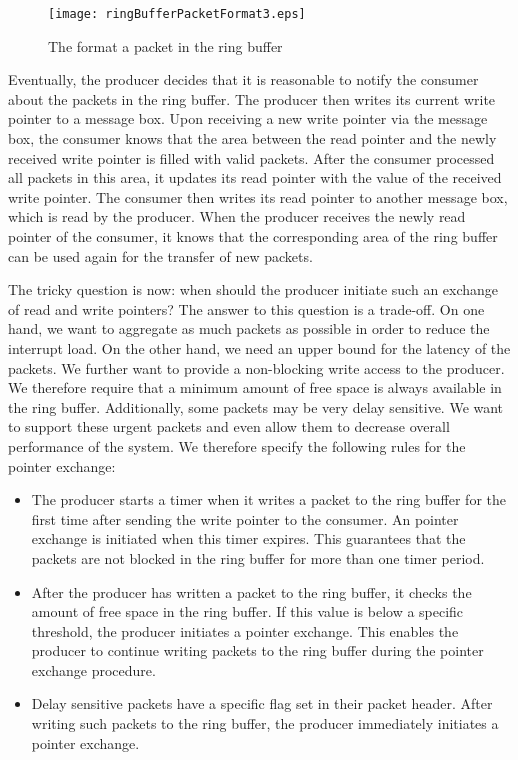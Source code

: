\begin{figure}
  \begin{center}
		 \texttt{[image: ringBufferPacketFormat3.eps]}
  \caption{The format a packet in the ring buffer}
  \label{ringBufferPacketFormat.eps}
  \end{center}
\end{figure}
Eventually, the producer decides that it is reasonable to notify the consumer about the packets in the ring buffer. The producer then writes its current write pointer to a message box. Upon receiving a new write pointer via the message box, the consumer knows that the area between the read pointer and the newly received write pointer is filled with valid packets. After the consumer processed all packets in this area, it updates its read pointer with the value of the received write pointer. The consumer then writes its read pointer to another message box, which is read by the producer. When the producer receives the newly read pointer of the consumer, it knows that the corresponding area of the ring buffer can be used again for the transfer of new packets.

The tricky question is now: when should the producer initiate such an exchange of read and write pointers? The answer to this question is a trade-off. On one hand, we want to aggregate as much packets as possible in order to reduce the interrupt load. On the other hand, we need an upper bound for the latency of the packets. We further want to provide a non-blocking write access to the producer. We therefore require that a minimum amount of free space is always available in the ring buffer. Additionally, some packets may be very delay sensitive. We want to support these urgent packets and even allow them to decrease overall performance of the system. We therefore specify the following rules for the pointer exchange:
\begin{itemize}
\item The producer starts a timer when it writes a packet to the ring buffer for the first time after sending the write pointer to the consumer. An pointer exchange is initiated when this timer expires. This guarantees that the packets are not blocked in the ring buffer for more than one timer period.
\item After the producer has written a packet to the ring buffer, it checks the amount of free space in the ring buffer. If this value is below a specific threshold, the producer initiates a pointer exchange. This enables the producer to continue writing packets to the ring buffer during the pointer exchange procedure.
\item Delay sensitive packets have a specific flag set in their packet header. After writing such packets to the ring buffer, the producer immediately initiates a pointer exchange. 
\end{itemize}














